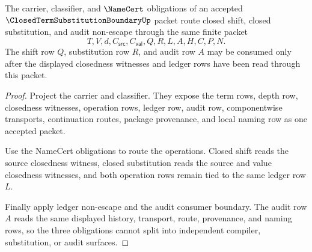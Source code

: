 \begin{theorem}
\label{thm:closed-term-substitution-boundary-obligation-route-triad}
The carrier, classifier, and $\NameCert$ obligations of an accepted $\ClosedTermSubstitutionBoundaryUp$ packet route closed shift, closed substitution, and audit non-escape through the same finite packet
$$
T,V,d,C_{\mathsf{src}},C_{\mathsf{val}},Q,R,L,A,H,C,P,N.
$$
The shift row $Q$, substitution row $R$, and audit row $A$ may be consumed only after the displayed closedness witnesses and ledger rows have been read through this packet.
\end{theorem}
\begin{proof}
Project the carrier and classifier. They expose the term rows, depth row, closedness witnesses, operation rows, ledger row, audit row, componentwise transports, continuation routes, package provenance, and local naming row as one accepted packet.

Use the NameCert obligations to route the operations. Closed shift reads the source closedness witness, closed substitution reads the source and value closedness witnesses, and both operation rows remain tied to the same ledger row $L$.

Finally apply ledger non-escape and the audit consumer boundary. The audit row $A$ reads the same displayed history, transport, route, provenance, and naming rows, so the three obligations cannot split into independent compiler, substitution, or audit surfaces.
\end{proof}

